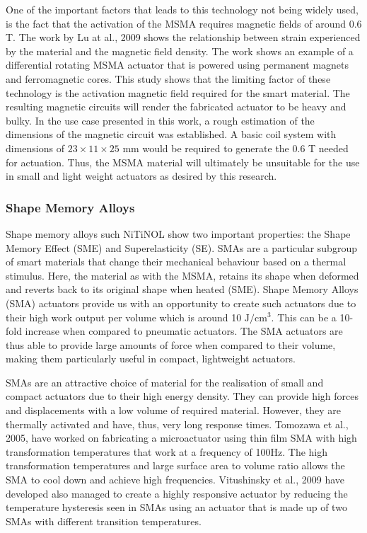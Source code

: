 One of the important factors that leads to this technology not being widely used, is the fact that the activation of the MSMA requires magnetic fields of around 0.6 T. The work by Lu at al., 2009\cite{lu_optimal_2009} shows the relationship between strain experienced by the material and the magnetic field density. The work shows an example of a differential rotating MSMA actuator that is powered using permanent magnets and ferromagnetic cores. This study shows that the limiting factor of these technology is the activation magnetic field required for the smart material. The resulting magnetic circuits will render the fabricated actuator to be heavy and bulky. In the use case presented in this work, a rough estimation of the dimensions of the magnetic circuit was established. A basic coil system with dimensions of $23\times11\times25$ mm would be required to generate the 0.6 T needed for actuation. Thus, the MSMA material will ultimately be unsuitable for the use in small and light weight actuators as desired by this research.

\subsubsection{Shape Memory Alloys}
Shape memory alloys such NiTiNOL show two important properties: the Shape Memory Effect (SME) and Superelasticity (SE)\cite{rao_design_2015}. SMAs are a particular subgroup of smart materials that change their mechanical behaviour based on a thermal stimulus. Here, the material as with the MSMA, retains its shape when deformed and reverts back to its original shape when heated (SME). Shape Memory Alloys (SMA) actuators provide us with an opportunity to create such actuators due to their high work output per volume which is around 10 $\mathrm{J}/\mathrm{cm}^3$\cite{mohd_jani_review_2014}. This can be a 10-fold increase when compared to pneumatic actuators. The SMA actuators are thus able to provide large amounts of force when compared to their volume, making them particularly useful in compact, lightweight actuators.

SMAs are an attractive choice of material for the realisation of small and compact actuators due to their high energy density. They can provide high forces and displacements with a low volume of required material. However, they are thermally activated and have, thus, very long response times. Tomozawa et al.\cite{tomozawa_characterization_2005}, 2005, have worked on fabricating a microactuator using thin film SMA with high transformation temperatures that work at a frequency of 100Hz. The high transformation temperatures and large surface area to volume ratio allows the SMA to cool down and achieve high frequencies. Vitushinsky et al.\cite{vitushinsky_bistable_2009}, 2009 have developed also managed to create a highly responsive actuator by reducing the temperature hysteresis seen in SMAs using an actuator that is made up of two SMAs with different transition temperatures.

